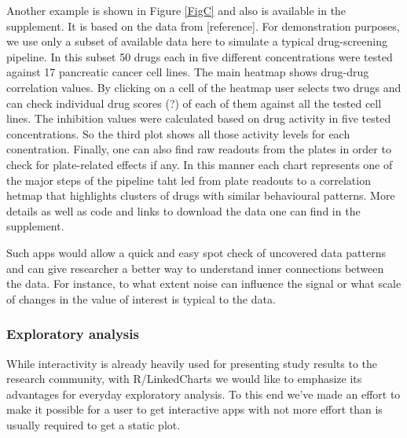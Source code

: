 \documentclass[twocolumn,10pt]{article}
\begin{document}
Another example is shown in Figure \ref{FigC} and also is available in the supplement. It is based on the data from [reference].
For demonstration purposes, we use only a subset of available data here to simulate a typical drug-screening pipeline. In this subset 50 drugs each in five different concentrations were tested against 17 pancreatic cancer cell lines. The main heatmap shows drug-drug correlation values. By clicking on a cell of the heatmap user selects two drugs and can check individual drug scores (?) of each of them against all the tested cell lines. The inhibition values were calculated based on drug activity in five tested concentrations. So the third plot shows all those activity levels for each conentration. Finally, one can also find raw readouts from the plates in order to check for plate-related effects if any. In this manner each chart represents one of the major steps of the pipeline taht led from plate readouts to a correlation hetmap that highlights clusters of drugs with similar behavioural patterns. More details as well as code and links to download the data one can find in the supplement. 

Such apps would allow a quick and easy spot check of uncovered data patterns and can give researcher a better way to understand inner connections between the data. For instance, to what extent noise can influence the signal or what scale of changes in the value of interest is typical to the data.

\subsubsection{Exploratory analysis}

While interactivity is already heavily used for presenting study results to the research community, with R/LinkedCharts we would like to emphasize its advantages for everyday exploratory analysis. To this end we've made an effort to make it possible for a user to get interactive apps with not more effort than is usually required to get a static plot.
\end{document}
